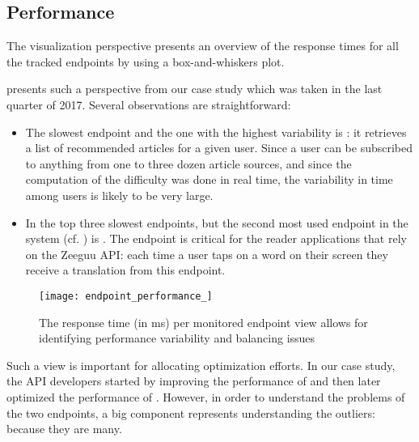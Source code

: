 
\subsection{Performance}
\label{sec:perf}

The  visualization perspective presents
an overview of the response times for all the tracked endpoints 
by using a box-and-whiskers plot. 

 presents such a perspective from our case study which 
was taken in the last quarter of 2017. Several observations are 
straightforward: 

\begin{itemize}

  \item The slowest endpoint and the one with the highest variability is \epFeedItemsColor: it retrieves a list of recommended articles for a given user. Since a user can be subscribed to anything from one to three dozen article sources, and since the computation of the difficulty was done in real time, the variability in time among users is likely to be very large. 

  \item In the top three slowest endpoints, but the second most used endpoint in the system (cf. ) is \epTranslationsColor. The endpoint is critical for the reader applications that rely on the Zeeguu API: each time a user taps on a word on their screen they receive a translation from this endpoint.
 
\end{itemize}

\begin{figure}
 \centering
 \texttt{[image: endpoint\_performance\_]}
 \caption{The response time (in ms) per monitored endpoint view allows for identifying performance variability and balancing issues}
 \label{fig:ep}
\end{figure}

Such a view is important for allocating optimization efforts. In our case study, the API developers started by improving the performance of \epTranslationsColor and then later optimized the performance of \epFeedItemsColor. However, in order to understand the problems of the two endpoints, a big component represents understanding the outliers: because they are many.  


